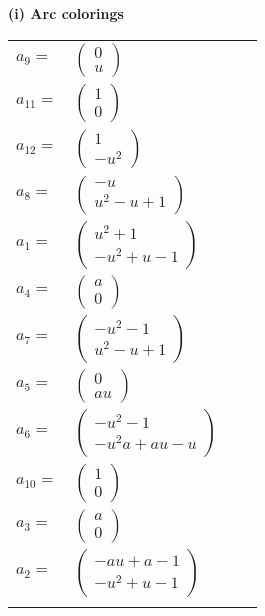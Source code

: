 \documentclass[1p]{elsarticle_modified}
\theoremstyle{definition}
\begin{document}
\flushleft \textbf{(i) Arc colorings}\\
\begin{tabular}{m{7pt} m{180pt} m{7pt} m{180pt} }
\flushright $a_{9}=$&$\begin{pmatrix}0\\u\end{pmatrix}$ \\
\flushright $a_{11}=$&$\begin{pmatrix}1\\0\end{pmatrix}$ \\
\flushright $a_{12}=$&$\begin{pmatrix}1\\- u^2\end{pmatrix}$ \\
\flushright $a_{8}=$&$\begin{pmatrix}- u\\u^2- u+1\end{pmatrix}$ \\
\flushright $a_{1}=$&$\begin{pmatrix}u^2+1\\- u^2+u-1\end{pmatrix}$ \\
\flushright $a_{4}=$&$\begin{pmatrix}a\\0\end{pmatrix}$ \\
\flushright $a_{7}=$&$\begin{pmatrix}- u^2-1\\u^2- u+1\end{pmatrix}$ \\
\flushright $a_{5}=$&$\begin{pmatrix}0\\a u\end{pmatrix}$ \\
\flushright $a_{6}=$&$\begin{pmatrix}- u^2-1\\- u^2 a+a u- u\end{pmatrix}$ \\
\flushright $a_{10}=$&$\begin{pmatrix}1\\0\end{pmatrix}$ \\
\flushright $a_{3}=$&$\begin{pmatrix}a\\0\end{pmatrix}$ \\
\flushright $a_{2}=$&$\begin{pmatrix}- a u+a-1\\- u^2+u-1\end{pmatrix}$\\&\end{tabular}
\end{document}
